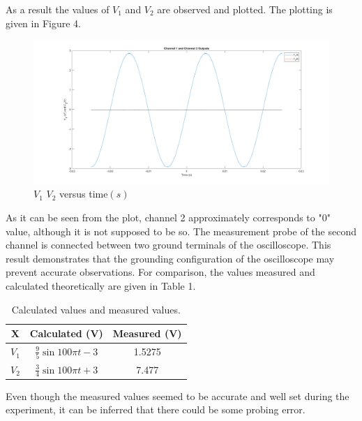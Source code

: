 \documentclass[letterpaper,12pt]{article}
\begin{document}
As a result the values of \(V_1\) and \(V_2\) are observed and plotted. The plotting is given in Figure 4. 
\begin{figure}[H]
	\centering
   \includegraphics[width=1\textwidth]{1b.png}
   \caption{\(V_1\) \(V_2\) versus time\((s)\) }
\end{figure} 

As it can be seen from the plot, channel 2 approximately corresponds to "0" value, although it is not supposed to be so. The measurement probe of the second channel is connected between two ground terminals of the oscilloscope. This result demonstrates that the grounding configuration of the oscilloscope may prevent accurate observations. For comparison, the values measured and calculated theoretically are given in Table 1. 
\begin{table}[H]
	\begin{center}
		\caption{Calculated values and measured values.}
		\vspace{2mm}
		\begin{tabular}{||c | c | c||} 
		 \hline 
		 X & Calculated (V) & Measured (V) \\ [0.5ex] 
		 \hline\hline
		 \(V_1\) & \( \frac{9}{5} \sin {100 \pi t } -3 \) & 1.5275  \\ 
		 \hline
		 \(V_2\) & \( \frac{3}{4} \sin {100 \pi t } +3 \) & 7.477  \\
		 \hline
		\end{tabular}
	\end{center}
\end{table}
Even though the measured values seemed to be accurate and well set during the experiment, it can be inferred that there could be some probing error.
\end{document}
